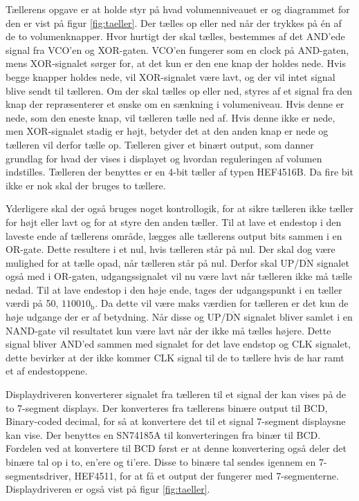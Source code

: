 Tællerens opgave er at holde styr på hvad volumenniveauet er og diagrammet for den er vist på figur \ref{fig:taeller}. Der tælles op eller ned når der trykkes på én af de to volumenknapper. Hvor hurtigt der skal tælles, bestemmes af det AND'ede signal fra VCO'en og XOR-gaten. VCO'en fungerer som en clock på AND-gaten, mens XOR-signalet sørger for, at det kun er den ene knap der holdes nede. Hvis begge knapper holdes nede, vil XOR-signalet være lavt, og der vil intet signal blive sendt til tælleren. Om der skal tælles op eller ned, styres af et signal fra den knap der repræsenterer et ønske om en sænkning i volumeniveau. Hvis denne er nede, som den eneste knap, vil tælleren tælle ned af. Hvis denne ikke er nede, men XOR-signalet stadig er højt, betyder det at den anden knap er nede og tælleren vil derfor tælle op. Tælleren giver et binært output, som danner grundlag for hvad der vises i displayet og hvordan reguleringen af volumen indstilles. Tælleren der benyttes er en 4-bit tæller af typen HEF4516B\cite{hef4516b-datablad}. Da fire bit ikke er nok skal der bruges to tællere.

Yderligere skal der også bruges noget kontrollogik, for at sikre tælleren ikke tæller for højt eller lavt og for at styre den anden tæller. Til at lave et endestop i den laveste ende af tællerens område, lægges alle tællerens output bits sammen i en OR-gate. Dette resultere i et nul, hvis tælleren står på nul. Der skal dog være mulighed for at tælle opad, når tælleren står på nul. Derfor skal UP/$\overline{\mathrm{DN}}$ signalet også med i OR-gaten, udgangssignalet vil nu være lavt når tælleren ikke må tælle nedad. Til at lave endestop i den høje ende, tages der udgangspunkt i en tæller værdi på 50, $110010_\mathrm{b}$. Da dette vil være maks værdien for tælleren er det kun de høje udgange der er af betydning. Når disse og UP/$\overline{\mathrm{DN}}$ signalet bliver samlet i en NAND-gate vil resultatet kun være lavt når der ikke må tælles højere. Dette signal bliver AND'ed sammen med signalet for det lave endstop og CLK signalet, dette bevirker at der ikke kommer CLK signal til de to tællere hvis de har ramt et af endestoppene.

Displaydriveren konverterer signalet fra tælleren til et signal der kan vises på de to 7-segment displays. Der konverteres fra tællerens binære output til BCD, Binary-coded decimal, for så at konvertere det til et signal 7-segment displaysne kan vise. Der benyttes en SN74185A\cite{sn74185a-datablad} til konverteringen fra binær til BCD. Fordelen ved at konvertere til BCD først er at denne konvertering også deler det binære tal op i to, en'ere og ti'ere. Disse to binære tal sendes igennem en 7-segmentsdriver, HEF4511\cite{hef4511-datablad}, for at få et output der fungerer med 7-segmenterne. Displaydriveren er også vist på figur \ref{fig:taeller}.

